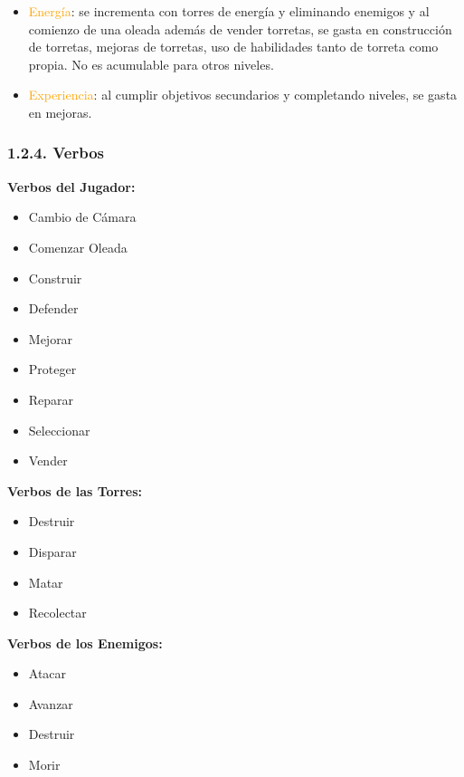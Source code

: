 \documentclass{article}
\begin{document}
\begin{itemize}
    \item \textcolor{Orange}{Energía}: se incrementa con torres de energía y eliminando enemigos y al comienzo de una oleada además de vender torretas, se gasta en construcción de torretas, mejoras de torretas, uso de habilidades tanto de torreta como propia. No es acumulable para otros niveles.
    \item \textcolor{Orange}{Experiencia}: al cumplir objetivos secundarios y completando niveles, se gasta en mejoras.

\end{itemize}

\subsubsection{1.2.4. Verbos}

\noindent \textbf{Verbos del Jugador:}

\begin{itemize}
    \item Cambio de Cámara
    \item Comenzar Oleada
    \item Construir
    \item Defender
    \item Mejorar
    \item Proteger
    \item Reparar
    \item Seleccionar
    \item Vender
\end{itemize}

\clearpage \textbf{Verbos de las Torres:}

\begin{itemize}
    \item Destruir
    \item Disparar
    \item Matar
    \item Recolectar
\end{itemize}

\hfill \break \textbf{Verbos de los Enemigos:}

\begin{itemize}
    \item Atacar
    \item Avanzar
    \item Destruir
    \item Morir
\end{itemize}
\end{document}
